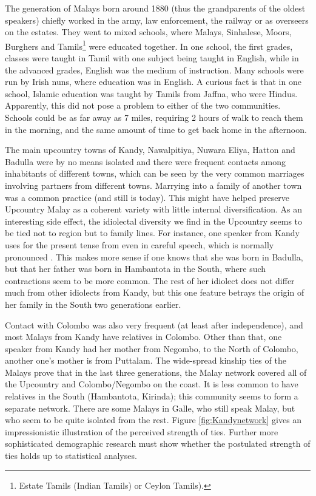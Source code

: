 The generation of Malays born around 1880 (thus the grandparents of the oldest speakers) chiefly worked in the army, law enforcement, the railway or as overseers on the estates. They went to mixed schools, where Malays, Sinhalese, Moors, Burghers and Tamils\footnote{Estate Tamils (Indian Tamils) or Ceylon Tamils).} were educated together. In one school, the first grades, classes were taught in Tamil with one subject being taught in English, while in the advanced grades, English was the medium of instruction\kuckn. Many schools were run by Irish nuns, where education was in English. A curious fact is that in one school, Islamic education was taught by Tamils from Jaffna, who were Hindus. Apparently, this did not pose a problem to either of the two communities. Schools could be as far away as 7 miles, requiring 2 hours of walk to reach them in the morning, and the same amount of time to get back home in the afternoon.

The main upcountry towns of Kandy, Nawalpitiya, Nuwara Eliya, Hatton and Badulla were by no means isolated and there were frequent contacts among inhabitants of different towns, which can be seen by the very common marriages involving partners from different towns. Marrying into a family of another town was a common practice (and still is today). This might have  helped preserve Upcountry Malay as a coherent variety with little internal diversification. As an interesting side effect, the idiolectal diversity we find in the Upcountry seems to be tied not to region but to family lines. For instance, one speaker from Kandy uses  for the present tense from  even in careful speech, which is normally pronounced . This makes more sense if one knows that she was born in Badulla, but that her father was born in Hambantota in the South, where such contractions seem to be more common. The rest of her idiolect does not differ much from other idiolects from Kandy, but this one feature betrays the origin of her family in the South two generations earlier.

Contact with Colombo was also very frequent (at least after independence), and most Malays from Kandy have relatives in Colombo. Other than that, one speaker from Kandy had her mother from Negombo, to the North of Colombo, another one's mother is from Puttalam. The wide-spread kinship ties of the Malays prove that in the last three generations, the Malay network covered all of the Upcountry and Colombo/Negombo on the coast. It is less common to have relatives in the South (Hambantota, Kirinda); this community seems to form a separate network. There are some Malays in Galle, who still speak Malay, but who seem to be quite isolated from the rest. Figure \ref{fig:Kandynetwork} gives an impressionistic illustration of the perceived strength of ties. Further more sophisticated demographic research must show whether the postulated strength of ties holds up to statistical analyses.

